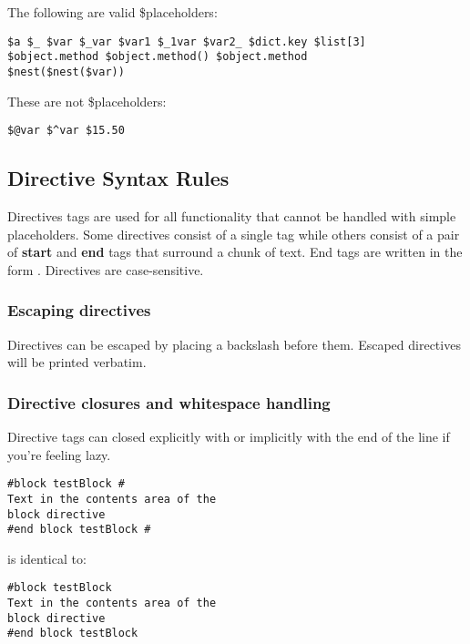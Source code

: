 The following are valid \$placeholders:
\begin{verbatim}
$a $_ $var $_var $var1 $_1var $var2_ $dict.key $list[3]
$object.method $object.method() $object.method
$nest($nest($var))
\end{verbatim}

These are not \$placeholders:
\begin{verbatim}
$@var $^var $15.50
\end{verbatim}

\subsection{Directive Syntax Rules}
\label{language.directives}

Directives tags are used for all functionality that cannot be handled with
simple placeholders. Some directives consist of a single tag while others
consist of a pair of {\bf start} and {\bf end} tags that surround a chunk of
text.  End tags are written in the form .
Directives are case-sensitive.

\subsubsection{Escaping directives}
\label{language.directives.escaping}

Directives can be escaped by placing a backslash before them.  Escaped
directives will be printed verbatim.

\subsubsection{Directive closures and whitespace handling}
\label{language.directives.closures}
Directive tags can closed explicitly with \code{\#} or implicitly with the end
of the line if you're feeling lazy.

\begin{verbatim}
#block testBlock #
Text in the contents area of the
block directive
#end block testBlock #
\end{verbatim}
is identical to:
\begin{verbatim}
#block testBlock
Text in the contents area of the
block directive
#end block testBlock
\end{verbatim}

